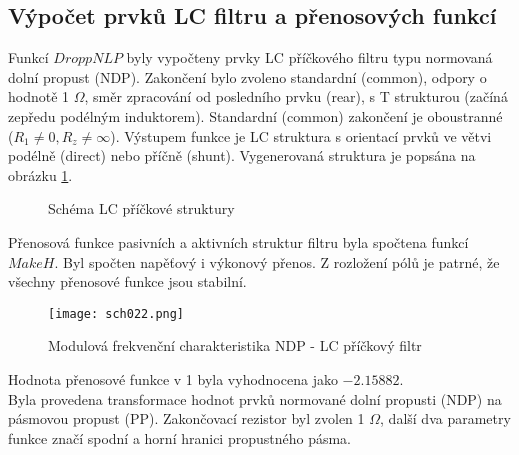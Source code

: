 \subsection{Výpočet prvků LC filtru a přenosových funkcí}\label{s:VYP}
\noindent Funkcí $DroppNLP$ byly vypočteny prvky LC příčkového filtru typu normovaná dolní propust (NDP). Zakončení bylo zvoleno standardní (common), odpory o hodnotě 1 $\Omega$, směr zpracování od posledního prvku (rear), s T strukturou (začíná zepředu podélným induktorem). Standardní (common) zakončení je oboustranné ($R_1 \neq 0, R_z \neq \infty$). Výstupem funkce je LC struktura s orientací prvků ve větvi podélně (direct) nebo příčně (shunt).
Vygenerovaná struktura je popsána na obrázku \ref{s:SCHEM}.
\begin{figure}[h]
\centering
{}
\caption{Schéma LC příčkové struktury \label{s:SCHEM}}
\end{figure}
\noindent Přenosová funkce pasivních a aktivních struktur filtru byla spočtena funkcí $MakeH$. Byl spočten  napěťový i výkonový přenos. Z rozložení pólů je patrné, že všechny přenosové funkce jsou stabilní.
\begin{figure}[h]
\centering
\texttt{[image: sch022.png]}
\caption{Modulová frekvenční charakteristika NDP - LC příčkový filtr}
\end{figure}
\noindent Hodnota přenosové funkce v 1 byla vyhodnocena jako $-2.15882$.\\
Byla provedena transformace hodnot prvků normované dolní propusti (NDP) na pásmovou propust (PP). Zakončovací rezistor byl zvolen 1 $\Omega$, další dva parametry funkce značí spodní a horní hranici propustného pásma.
